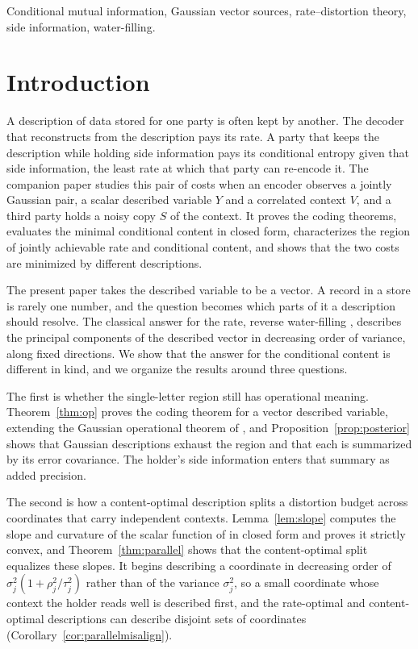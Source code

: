 \documentclass[11pt,onecolumn]{IEEEtran}
\begin{document}
\begin{IEEEkeywords}
Conditional mutual information, Gaussian vector sources, rate--distortion
theory, side information, water-filling.
\end{IEEEkeywords}

\section{Introduction}
\label{sec:intro}

A description of data stored for one party is often kept by another. The
decoder that reconstructs from the description pays its rate. A party
that keeps the description while holding side information pays its
conditional entropy given that side information, the least rate at which
that party can re-encode it. The companion paper \cite{bond2026tit}
studies this pair of costs when an encoder observes a jointly Gaussian
pair, a scalar described variable $Y$ and a correlated context $V$, and a
third party holds a noisy copy $S$ of the context. It proves the coding
theorems, evaluates the minimal conditional content in closed form,
characterizes the region of jointly achievable rate and conditional
content, and shows that the two costs are minimized by different
descriptions.

The present paper takes the described variable to be a vector. A record
in a store is rarely one number, and the question becomes which parts of
it a description should resolve. The classical answer for the rate,
reverse water-filling \cite{berger1971}, describes the principal
components of the described vector in decreasing order of variance, along
fixed directions. We show that the answer for the conditional content is
different in kind, and we organize the results around three questions.

The first is whether the single-letter region still has operational
meaning. Theorem~\ref{thm:op} proves the coding theorem for a vector
described variable, extending the Gaussian operational theorem of
\cite{bond2026tit}, and Proposition~\ref{prop:posterior} shows that
Gaussian descriptions exhaust the region and that each is summarized by
its error covariance. The holder's side information enters that summary
as added precision.

The second is how a content-optimal description splits a distortion budget
across coordinates that carry independent contexts. Lemma~\ref{lem:slope}
computes the slope and curvature of the scalar function of
\cite{bond2026tit} in closed form and proves it strictly convex, and
Theorem~\ref{thm:parallel} shows that the content-optimal split equalizes
these slopes. It begins describing a coordinate in decreasing order of
$\sigma_j^2(1+\rho_j^2/\tau_j^2)$ rather than of the variance
$\sigma_j^2$, so a small coordinate whose context the holder reads well is
described first, and the rate-optimal and content-optimal descriptions can
describe disjoint sets of coordinates
(Corollary~\ref{cor:parallelmisalign}).
\end{document}
